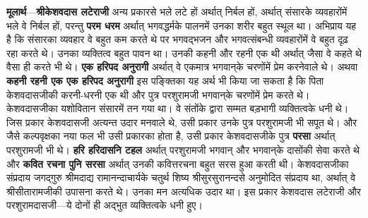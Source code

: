 \begin{sloppypar}\justifying{}
\textbf{मूलार्थ}—\textbf{श्रीकेशवदास लटेराजी} अन्य प्रकारसे भले लटे हों अर्थात् निर्बल हों, अर्थात् संसारके व्यवहारोंमें भले वे निर्बल हों, परन्तु \textbf{परम धरम} अर्थात् भगवद्धर्मके पालनमें उनका शरीर बहुत स्थूल था। अभिप्राय यह है कि संसारका व्यवहार वे बहुत कम करते थे पर भगवद्भजन और भगवत्संबन्धी व्यवहारोंमें वे बहुत दृढ़ रहा करते थे। उनका व्यक्तित्व बहुत पावन था। उनकी कहनी और रहनी एक थी अर्थात् जैसा वे कहते थे वैसा ही करते भी थे। \textbf{एक हरिपद अनुरागी} अर्थात् वे एकमात्र भगवान्‌के चरणोंमें प्रेम करनेवाले थे। अथवा \textbf{कहनी रहनी एक एक हरिपद अनुरागी} इस पङ्क्तिका यह अर्थ भी किया जा सकता है कि पिता केशवदासजीकी करनी-धरनी एक थी और पुत्र परशुरामजी भगवान्‌के चरणोंमें प्रेम करते थे। केशवदासजीका यशोवितान संसारमें तन गया था। वे संतोंके द्वारा सम्मत बड़भागी व्यक्तित्वके धनी थे। जिस प्रकार केशवदासजी अत्यन्त उदार मनवाले थे, उसी प्रकार उनके पुत्र परशुरामजी भी सपूत थे। और जैसे कल्पवृक्षका नया फल भी उसी प्रकारका होता है, उसी प्रकार केशवदासजीके पुत्र \textbf{परसा} अर्थात् परशुरामजी भी थे। \textbf{हरि हरिदासनि टहल} अर्थात् परशुरामजी भगवान् और भगवान्‌के दासोंकी सेवा करते थे और \textbf{कवित रचना पुनि सरसा} अर्थात् उनकी कवित्त\-रचना बहुत सरस हुआ करती थी। केशवदासजीका संप्रदाय जगद्गुरु श्रीमदाद्य रामानन्दाचार्यके चतुर्थ शिष्य श्रीसुरसुरानन्दसे अनुमोदित संप्रदाय था, अर्थात् वे श्रीसीता\-रामजीकी उपासना करते थे। उनका मन अत्यधिक उदार था। इस प्रकार केशवदास लटेराजी और परशुरामदासजी—ये दोनों ही अद्भुत व्यक्तित्वके धनी हुए।
\end{sloppypar}


